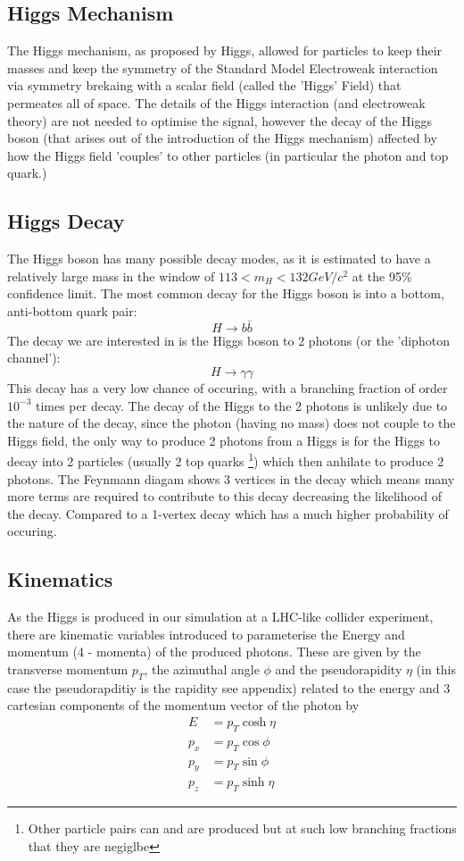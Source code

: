 \documentclass{article}
\begin{document}
\subsection{Higgs Mechanism}
The Higgs mechanism, as proposed by Higgs, allowed for particles to keep their masses and keep the symmetry of the Standard Model Electroweak interaction via symmetry brekaing with a scalar field (called the 'Higgs' Field) that permeates all of space. The details of the Higgs interaction (and electroweak theory) are not needed to optimise the signal, however the decay of the Higgs boson (that arises out of the introduction of the Higgs mechanism) affected by how the Higgs field 'couples' to other particles (in particular the photon and top quark.)\subsection{Higgs Decay}
The Higgs boson has many possible decay modes, as it is estimated to have a relatively large mass in the window of $113 < m_H < 132 GeV/c^2$ at the 95\% confidence limit. The most common decay for the Higgs boson is into a bottom, anti-bottom quark pair:
\begin{equation}
H \rightarrow b \bar{b}
\end{equation}
The decay we are interested in is the Higgs boson to 2 photons (or the 'diphoton channel'):
\begin{equation}
H \rightarrow \gamma \gamma
\end{equation}
This decay has a very low chance of occuring, with a branching fraction of order $10^{-3}$ times per decay. The decay of the Higgs to the 2 photons is unlikely due to the nature of the decay, since the photon (having no mass) does not couple to the Higgs field, the only way to produce 2 photons from a Higgs is for the Higgs to decay into 2 particles (usually 2 top quarks \footnote{Other particle pairs can and are produced but at such low branching fractions that they are negiglbe}) which then anhilate to produce 2 photons. The Feynmann diagam shows 3 vertices in the decay which means many more terms are required to contribute to this decay decreasing the likelihood of the decay. Compared to a 1-vertex decay which has a much higher probability of occuring. 
\subsection{Kinematics}
As the Higgs is produced in our simulation at a LHC-like collider experiment, there are kinematic variables introduced to parameterise the Energy and momentum (4 - momenta) of the produced photons. These are given by the transverse momentum $p_T$, the azimuthal angle $\phi$ and the pseudorapidity $\eta$ (in this case the pseudorapditiy is the rapidity see appendix) related to the energy and 3 cartesian components of the momentum vector of the photon by
\begin{align}
E &= p_T \cosh {\eta} \\
p_x &= p_T \cos{\phi} \\
p_y &= p_T \sin{\phi} \\
p_z &= p_T \sinh{\eta}
\end{align}
\end{document}
